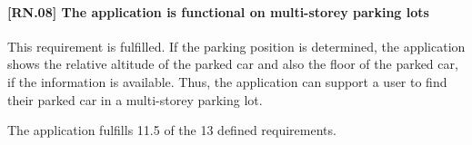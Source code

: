\paragraph{[RN.08] The application is functional on multi-storey parking lots}
This requirement is fulfilled. If the parking position is determined, the application shows the relative altitude of the parked car and also the floor of the parked car, if the information is available. Thus, the application can support a user to find their parked car in a multi-storey parking lot.

The application fulfills 11.5 of the 13 defined requirements. 


